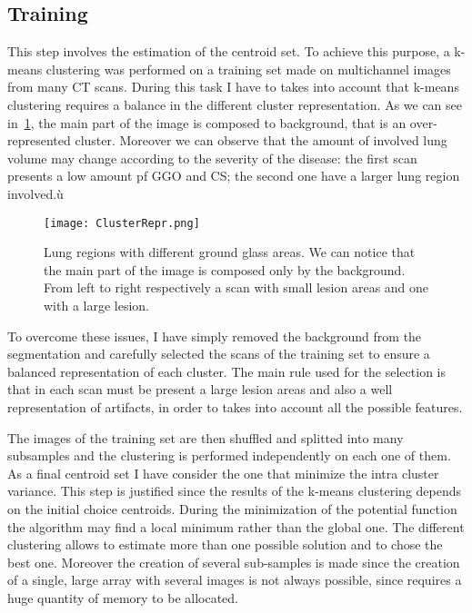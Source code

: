 \documentclass{standalone}
\begin{document}
	\subsection*{Training}
	
	This step involves the estimation of the centroid set. To achieve this purpose, a k-means clustering was performed on a training set made on multichannel images from many CT scans. During this task I have to takes into account that k-means clustering requires a balance in the different cluster representation. As we can see in \figurename\,\ref{fig:ClusterRepr}, the main part of the image is composed to background, that is an over-represented cluster. Moreover we can observe that the amount of involved lung volume may change according to the  severity of the disease: the first scan presents a low amount pf GGO and CS; the second one have a larger lung region involved.ù
	 
	\begin{figure}[h!]
		\centering
		\texttt{[image: ClusterRepr.png]}
		\caption{Lung regions with different ground glass areas. We can notice that the main part of the image is composed only by the background. From left to right respectively a scan with small lesion areas and one with a large lesion. }\label{fig:ClusterRepr}
	\end{figure}

	
	To overcome these issues, I have simply removed the background from the segmentation and carefully selected the scans of the training set to ensure a balanced representation of each cluster. The main rule used for the selection is that in each scan must be present a large lesion areas and also a well representation of artifacts, in order to takes into account all the possible features.
	
	The images of the training set are then shuffled and splitted into many subsamples and the clustering is performed independently on each one of them. As a final centroid set I have consider the one that minimize the intra cluster variance. This step is justified since the results of the k-means clustering depends on the initial choice centroids. During the minimization of the potential function the algorithm may find a local minimum rather than the global one. The different clustering allows to estimate more than one possible solution and to chose the best one. 		
	Moreover the creation of several sub-samples is made since the creation of a single, large array with several images is not always possible, since requires a huge quantity of memory to be allocated.
\end{document}
